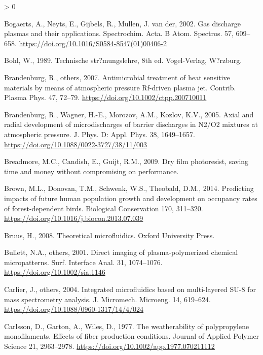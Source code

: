 \documentclass[
  11pt,
  twoside]{article}
\newlength{\cslhangindent}
\newenvironment{CSLReferences}[2] %
 {%
  \setlength{\parindent}{0pt}
  \ifodd #1 \everypar{\setlength{\hangindent}{\cslhangindent}}\ignorespaces\fi
  \ifnum #2 > 0
  \setlength{\parskip}{#2\baselineskip}
  \fi
 }%
 {}
\begin{document}
\begin{CSLReferences}{1}{0}
\leavevmode\hypertarget{ref-Boga02}{}%
Bogaerts, A., Neyts, E., Gijbels, R., Mullen, J. van der, 2002. Gas discharge plasmas and their applications. Spectrochim. Acta. B Atom. Spectros. 57, 609--658. \url{https://doi.org/10.1016/S0584-8547(01)00406-2}

\leavevmode\hypertarget{ref-Bohl1989}{}%
Bohl, W., 1989. Technische str?mungslehre, 8th ed. Vogel-Verlag, W?rzburg.

\leavevmode\hypertarget{ref-Bran07}{}%
Brandenburg, R., others, 2007. Antimicrobial treatment of heat sensitive materials by means of atmospheric pressure {Rf}-driven plasma jet. Contrib. Plasma Phys. 47, 72--79. \url{https://doi.org/10.1002/ctpp.200710011}

\leavevmode\hypertarget{ref-Bran05}{}%
Brandenburg, R., Wagner, H.-E., Morozov, A.M., Kozlov, K.V., 2005. Axial and radial development of microdischarges of barrier discharges in {N2/O2} mixtures at atmospheric pressure. J. Phys. D: Appl. Phys. 38, 1649--1657. \url{https://doi.org/10.1088/0022-3727/38/11/003}

\leavevmode\hypertarget{ref-Brea09}{}%
Breadmore, M.C., Candish, E., Guijt, R.M., 2009. Dry film photoresist, saving time and money without compromising on performance.

\leavevmode\hypertarget{ref-Brown14}{}%
Brown, M.L., Donovan, T.M., Schwenk, W.S., Theobald, D.M., 2014. Predicting impacts of future human population growth and development on occupancy rates of forest-dependent birds. Biological Conservation 170, 311--320. \url{https://doi.org/10.1016/j.biocon.2013.07.039}

\leavevmode\hypertarget{ref-Bruu08}{}%
Bruus, H., 2008. Theoretical microfluidics. Oxford University Press.

\leavevmode\hypertarget{ref-Bull01}{}%
Bullett, N.A., others, 2001. Direct imaging of plasma-polymerized chemical micropatterns. Surf. Interface Anal. 31, 1074--1076. \url{https://doi.org/10.1002/sia.1146}

\leavevmode\hypertarget{ref-Carl04}{}%
Carlier, J., others, 2004. Integrated microfluidics based on multi-layered SU-8 for mass spectrometry analysis. J. Micromech. Microeng. 14, 619--624. \url{https://doi.org/10.1088/0960-1317/14/4/024}

\leavevmode\hypertarget{ref-Carl1977}{}%
Carlsson, D., Garton, A., Wiles, D., 1977. The weatherability of polypropylene monofilaments. Effects of fiber production conditions. Journal of Applied Polymer Science 21, 2963--2978. \url{https://doi.org/10.1002/app.1977.070211112}


\end{CSLReferences}
\end{document}
